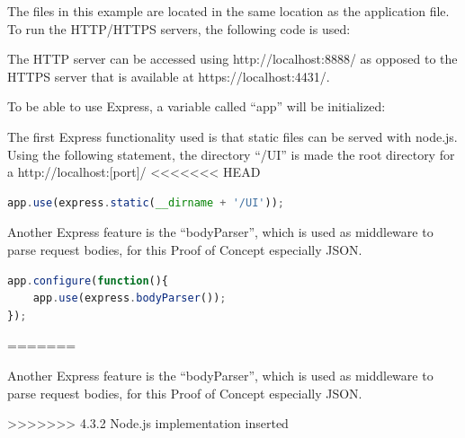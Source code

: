 The files in this example are located in the same location as the application file. To run the HTTP/HTTPS servers, the following code is used:





The HTTP server can be accessed using http://localhost:8888/ as opposed to the HTTPS server that is available at https://localhost:4431/.

To be able to use Express, a variable called “app” will be initialized:





The first Express functionality used is that static files can be served with node.js. Using the following statement, the directory “/UI” is made the root directory for a http://localhost:[port]/
<<<<<<< HEAD
\begin{lstlisting}[language=javascript,caption={Serving static assets with Express}]
app.use(express.static(__dirname + '/UI'));
\end{lstlisting}
Another Express feature is the “bodyParser”, which is used as middleware to parse request bodies, for this Proof of Concept especially JSON.

\begin{lstlisting}[language=javascript,caption={Using the $bodyParser$}]
app.configure(function(){
    app.use(express.bodyParser());
});
\end{lstlisting}
=======





Another Express feature is the “bodyParser”, which is used as middleware to parse request bodies, for this Proof of Concept especially JSON.


>>>>>>> 4.3.2 Node.js implementation inserted


